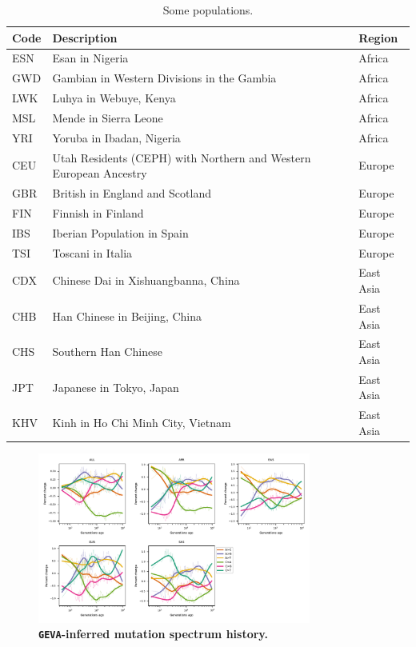\documentclass[]{article}
\newcommand{\GEVA}{\texttt{GEVA}\xspace}
\begin{document}
\begin{table}[h]
\caption{\label{tab:1kgpops}Some \citet{10002015global} populations.}
\centering
\begin{tabular}[t]{lll}
\toprule
Code & Description & Region\\
\midrule
ESN & Esan in Nigeria & Africa\\
GWD & Gambian in Western Divisions in the Gambia & Africa\\
LWK & Luhya in Webuye, Kenya & Africa\\
MSL & Mende in Sierra Leone & Africa\\
YRI & Yoruba in Ibadan, Nigeria & Africa\\
\addlinespace
CEU & Utah Residents (CEPH) with Northern and Western European Ancestry & Europe\\
GBR & British in England and Scotland & Europe\\
FIN & Finnish in Finland & Europe\\
IBS & Iberian Population in Spain & Europe\\
TSI & Toscani in Italia & Europe\\
\addlinespace
CDX & Chinese Dai in Xishuangbanna, China & East Asia\\
CHB & Han Chinese in Beijing, China & East Asia\\
CHS & Southern Han Chinese & East Asia\\
JPT & Japanese in Tokyo, Japan & East Asia\\
KHV & Kinh in Ho Chi Minh City, Vietnam & East Asia\\
\bottomrule
\end{tabular}
\end{table}

\clearpage

\begin{figure}[ht!]
    \centering
    \includegraphics[width=0.8\textwidth]{../plots/spectrum_history.geva.max_age.10000.pdf}
    \caption{
        \textbf{\GEVA-inferred mutation spectrum history.}
    }
    \label{fig:geva-spectra}
\end{figure}
\end{document}
